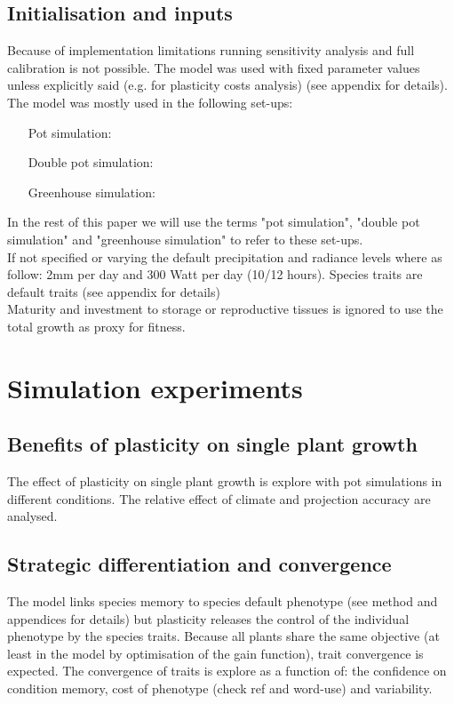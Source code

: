 \documentclass[review]{elsarticle}
\begin{document}
\subsection{Initialisation and inputs}
Because of implementation limitations running sensitivity analysis and full calibration is not possible. The model was used with fixed parameter values unless explicitly said (e.g. for plasticity costs analysis) (see appendix for details). The model was mostly used in the following set-ups:
\begin{itemize}
\item[Pot simulation:]
\item[Double pot simulation:]
\item[Greenhouse simulation:]
\end{itemize}
In the rest of this paper we will use the terms "pot simulation", "double pot simulation" and "greenhouse simulation" to refer  to these set-ups.\\
If not specified or varying the default precipitation and radiance levels where as follow: 2mm per day and 300 Watt per day (10/12 hours). Species traits are default traits (see appendix for details)\\
Maturity and investment to storage or reproductive tissues is ignored to use the total growth as proxy for fitness.

\section{Simulation experiments}
\subsection{Benefits of plasticity on single plant growth}
The effect of plasticity on single plant growth is explore with pot simulations in different conditions. The relative effect of climate and projection accuracy are analysed.


\subsection{Strategic differentiation and convergence}
The model links species memory to species default phenotype (see method and appendices for details) but plasticity releases the control of the individual phenotype by the species traits. Because all plants share the same objective (at least in the model by optimisation of the gain function), trait convergence is expected. The convergence of traits is explore as a function of: the confidence on condition memory, cost of phenotype (check ref and word-use) and variability. 
\end{document}
